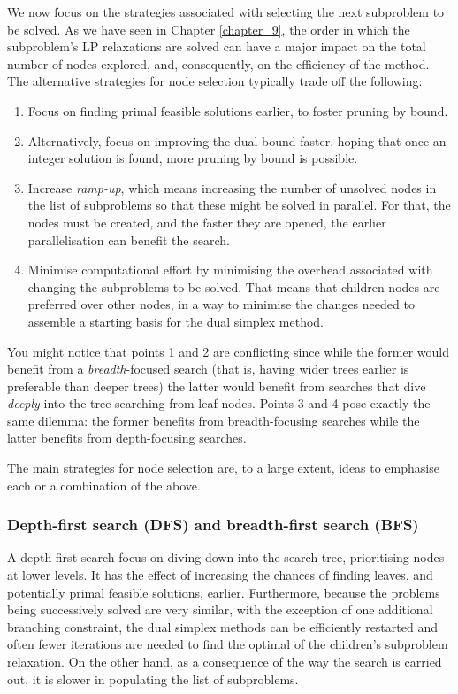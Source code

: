 We now focus on the strategies associated with selecting the next subproblem to be solved. As we have seen in Chapter \ref{chapter_9}, the order in which the subproblem's LP relaxations are solved can have a major impact on the total number of nodes explored, and, consequently, on the efficiency of the method. The alternative strategies for node selection typically trade off the following:
%
\begin{enumerate}
	\item Focus on finding primal feasible solutions earlier, to foster pruning by bound.
	\item Alternatively, focus on improving the dual bound faster, hoping that once an integer solution is found, more pruning by bound is possible.
	\item Increase \emph{ramp-up}, which means increasing the number of unsolved nodes in the list of subproblems so that these might be solved in parallel. For that, the nodes must be created, and the faster they are opened, the earlier parallelisation	can benefit the search.
	\item Minimise computational effort by minimising the overhead associated with changing the subproblems to be solved. That means that children nodes are preferred over other nodes, in a way to minimise the changes needed to assemble a starting basis for the dual simplex method.
\end{enumerate}

You might notice that points 1 and 2 are conflicting since while the former would benefit from a \emph{breadth}-focused search (that is, having wider trees earlier is preferable than deeper trees) the latter would benefit from searches that dive \emph{deeply} into the tree searching from leaf nodes. Points 3 and 4 pose exactly the same dilemma: the former benefits from breadth-focusing searches while the latter benefits from depth-focusing searches.

The main strategies for node selection are, to a large extent, ideas to emphasise each or a combination of the above. 

\subsubsection{Depth-first search (DFS) and breadth-first search (BFS)}

A depth-first search focus on diving down into the search tree, prioritising nodes at lower levels. It has the effect of increasing the chances of finding leaves, and potentially primal feasible solutions, earlier. Furthermore, because the problems being successively solved are very similar, with the exception of one additional branching constraint, the dual simplex methods can be efficiently restarted and often fewer iterations are needed to find the optimal of the children's subproblem relaxation. On the other hand, as a consequence of the way the search is carried out, it is slower in populating the list of subproblems. 

